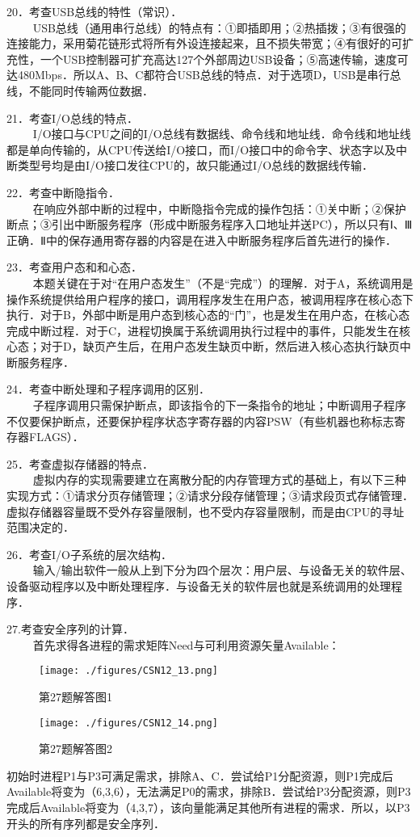 20．考查USB总线的特性（常识）．\\
$\qquad$ USB总线（通用串行总线）的特点有：①即插即用；②热插拨；③有很强的连接能力，采用菊花链形式将所有外设连接起来，且不损失带宽；④有很好的可扩充性，一个USB控制器可扩充高达127个外部周边USB设备；⑤高速传输，速度可达480Mbps．所以A、B、C都符合USB总线的特点．对于选项D，USB是串行总线，不能同时传输两位数据．

21．考查I/O总线的特点．\\
$\qquad$ I/O接口与CPU之间的I/O总线有数据线、命令线和地址线．命令线和地址线都是单向传输的，从CPU传送给I/O接口，而I/O接口中的命令字、状态字以及中断类型号均是由I/O接口发往CPU的，故只能通过I/O总线的数据线传输．

22．考查中断隐指令．\\
$\qquad$ 在响应外部中断的过程中，中断隐指令完成的操作包括：①关中断；②保护断点；③引出中断服务程序（形成中断服务程序入口地址并送PC），所以只有Ⅰ、Ⅲ正确．Ⅱ中的保存通用寄存器的内容是在进入中断服务程序后首先进行的操作．

23．考查用户态和和心态．\\
$\qquad$ 本题关键在于对“在用户态发生”（不是“完成”）的理解．对于A，系统调用是操作系统提供给用户程序的接口，调用程序发生在用户态，被调用程序在核心态下执行．对于B，外部中断是用户态到核心态的“门”，也是发生在用户态，在核心态完成中断过程．对于C，进程切换属于系统调用执行过程中的事件，只能发生在核心态；对于D，缺页产生后，在用户态发生缺页中断，然后进入核心态执行缺页中断服务程序．

24．考查中断处理和子程序调用的区别．\\
$\qquad$ 子程序调用只需保护断点，即该指令的下一条指令的地址；中断调用子程序不仅要保护断点，还要保护程序状态字寄存器的内容PSW（有些机器也称标志寄存器FLAGS）．

25．考查虚拟存储器的特点．\\
$\qquad$ 虚拟内存的实现需要建立在离散分配的内存管理方式的基础上，有以下三种实现方式：①请求分页存储管理；②请求分段存储管理；③请求段页式存储管理．虚拟存储器容量既不受外存容量限制，也不受内存容量限制，而是由CPU的寻址范围决定的．

26．考查I/O子系统的层次结构．\\
$\qquad$ 输入/输出软件一般从上到下分为四个层次：用户层、与设备无关的软件层、设备驱动程序以及中断处理程序．与设备无关的软件层也就是系统调用的处理程序．

27.考查安全序列的计算．\\
$\qquad$ 首先求得各进程的需求矩阵Need与可利用资源矢量Available：
\begin{figure}[ht]
\centering
\texttt{[image: ./figures/CSN12\_13.png]}
\caption{第27题解答图1} \label{CSN12_fig13}
\end{figure}
\begin{figure}[ht]
\centering
\texttt{[image: ./figures/CSN12\_14.png]}
\caption{第27题解答图2} \label{CSN12_fig14}
\end{figure}
初始时进程P1与P3可满足需求，排除A、C．尝试给P1分配资源，则P1完成后Available将变为（6,3,6），无法满足P0的需求，排除B．尝试给P3分配资源，则P3完成后Available将变为（4,3,7），该向量能满足其他所有进程的需求．所以，以P3开头的所有序列都是安全序列．

